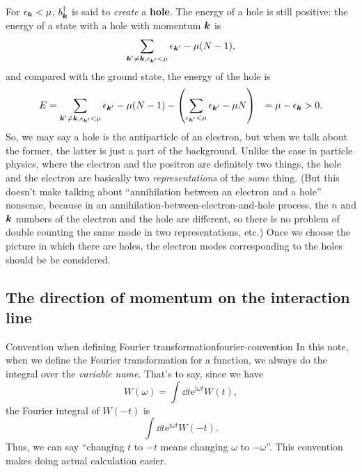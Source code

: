 \documentclass[hyperref, a4paper, 12pt]{report}
\newcommand*{\ii}{\mathrm{i}}
\newcommand*{\ee}{\mathrm{e}}
\newcommand*{\concept}[1]{{\textbf{#1}}}
\def\\{}%
\begin{document}
For $\epsilon_{\vb*{k}} < \mu$, $b_{\vb*{k}}^\dagger$ is said to \emph{create} a \concept{hole}.
The energy of a hole is still positive:
the energy of a state with a hole with momentum $\vb*{k}$
is 
\[
    \sum_{\vb*{k}' \neq \vb*{k}, \epsilon_{\vb*{k}'} < \mu} \epsilon_{\vb*{k}'} - \mu (N - 1),
\]
and compared with the ground state, the energy of the hole is 
\begin{equation}
    \begin{aligned}
        E &= \sum_{\vb*{k}' \neq \vb*{k}, \epsilon_{\vb*{k}'} < \mu} \epsilon_{\vb*{k}'} - \mu (N - 1) 
        - \left( \sum_{\epsilon_{\vb*{k}'} < \mu} \epsilon_{\vb*{k}'} - \mu N \right) \\
        &= \mu - \epsilon_{\vb*{k}} > 0.
    \end{aligned}
\end{equation}
So, we may say a hole is the antiparticle of an electron,
but when we talk about the former, 
the latter is just a part of the background.
Unlike the case in particle physics,
where the electron and the positron are definitely two things,
the hole and the electron are basically two \emph{representations} of the \emph{same} thing.
(But this doesn't make talking about ``annihilation between an electron and a hole'' nonsense,
because in an annihilation-between-electron-and-hole process,
the $n$ and $\vb*{k}$ numbers of the electron and the hole are different,
so there is no problem of double counting the same mode in two representations, etc.)
Once we choose the picture in which there are holes, 
the electron modes corresponding to the holes should be be considered.

\subsection{The direction of momentum on the interaction line}\label{sec:gw-bse.preliminaries.diagram.direction-line}

\begin{infobox}{Convention when defining Fourier transformation}{fourier-convention}
    In this note, when we define the Fourier transformation for a function,
    we always do the integral over the \emph{variable name}.
    That's to say, 
    since we have 
    \[
        W(\omega) = \int \dd{t} \ee^{\ii \omega t} W(t),
    \]
    the Fourier integral of $W(-t)$ is 
    \[
        \int \dd{t} \ee^{\ii \omega t} W(-t).
    \]
    Thus, we can say ``changing $t$ to $-t$ means changing $\omega$ to $- \omega$''.
    This convention makes doing actual calculation easier.
\end{infobox}
\end{document}
